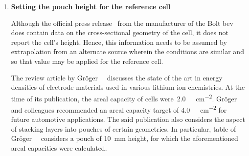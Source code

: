 \begin{enumerate}[ label=\textbf{\arabic*}), leftmargin=0pt, itemindent=20pt, labelwidth=15pt, labelsep=5pt, listparindent=0.7cm, align=left]
        The  task of  determining the  electrochemically active  overall surface
        area of the reference cell is now straightforward, and is obtained as
        \begin{align}
            \text{Overall surface area of reference cell}, A_\text{refcell} &=
            \frac{\text{1C-rate for the reference cell (\si{\ampere})}}{\text{1C-rate density (\si{\ampere\per\meter\squared})}} \\
                                                                            &= \frac{60}{29.23} \\
                                                                            &= \SI{2.053}{\meter\squared}
        \end{align}
        This  value  is  listed  in  \cref{tbl:lcoSimParamsSPMp2d}  for  use  in
        ,  but  is  \emph{not}
        used directly in  this layer optimisation work. This is  because, as the
        number  of  layers change,  the  overall  surface  area changes  as  per
        \cref{eq:overallarea}. However,  determining this value is  an important
        initial step in the determination of the surface area per layer.

    \item \textbf{Setting the pouch height for the reference cell}

        Although  the   official  press   release~\cite{GMBoltBatteryDims}  from
        the  manufacturer  of  the  Bolt  \gls{bev} does  contain  data  on  the
        cross-sectional  geometry of  the cell,  it does  not report  the cell's
        height. Hence,  this information  needs to  be assumed  by extrapolation
        from an alternate source wherein the  conditions are similar and so that
        value may be applied for the reference cell.

        The   review  article   by  Gr\"oger~\etal~\cite{Groger2015}   discusses
        the   state   of   the   art    in   energy   densities   of   electrode
        materials    used   in    various    lithium    ion   chemistries.    At
        the    time    of   its    publication,    the    areal   capacity    of
        cells  were~\approx\SI{2.0}{\milli\amphour\per\centi\meter\squared}.
        Gr\"oger and colleagues   recommended    an    areal    capacity  
        target    of \SI{4.0}{\milli\amphour\per\centi\meter\squared}  for
        future  automotive applications. The said publication also considers the
        aspect of stacking layers  into  pouches  of   certain  geometries.  In 
        particular,  table   of Gr\"oger~\etal~\cite{Groger2015} 
        considers a  pouch of  \SI{10}{\milli\meter} height,  for  which  the
        aforementioned  areal capacities were calculated.


\end{enumerate}
